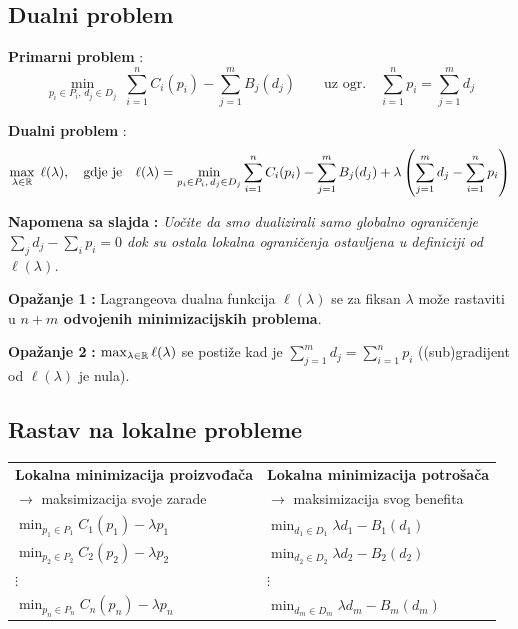 \subsection{Dualni problem}

\textbf{Primarni problem} :
\[
\min_{p_i\in P_i,\,d_j\in D_j}\;
\sum_{i=1}^{n}C_i(p_i) - \sum_{j=1}^{m}B_j(d_j)
\qquad\text{uz ogr.}\quad \sum_{i=1}^{n}p_i = \sum_{j=1}^{m}d_j
\]

\textbf{Dualni problem} :
\[
\max_{\lambda\in\mathbb{R}}\; \ell(\lambda), \quad\text{gdje je}\quad
\ell(\lambda) = \min_{p_i\in P_i,\,d_j\in D_j}
\sum_{i=1}^{n}C_i(p_i) - \sum_{j=1}^{m}B_j(d_j)
+ \lambda\left(\sum_{j=1}^{m}d_j - \sum_{i=1}^{n}p_i\right)
\]

\textbf{Napomena sa slajda} \textbf{:} \emph{Uočite da smo dualizirali
samo globalno ograničenje $\sum_j d_j - \sum_i p_i = 0$ dok su ostala lokalna
ograničenja ostavljena u definiciji od $\ell(\lambda)$.}

\textbf{Opažanje 1} \textbf{:} Lagrangeova dualna funkcija
$\ell(\lambda)$ se za fiksan $\lambda$ može rastaviti u \textbf{$n + m$
odvojenih minimizacijskih problema}.

\textbf{Opažanje 2} \textbf{:} $\max_{\lambda\in\mathbb{R}}\ell(\lambda)$ se
postiže kad je $\sum_{j=1}^{m}d_j = \sum_{i=1}^{n}p_i$ ((sub)gradijent od
$\ell(\lambda)$ je nula).

\subsection{Rastav na lokalne probleme}

\begin{center}
\begin{tabular}{P{6.4cm}P{6.4cm}}
\toprule
\textbf{Lokalna minimizacija proizvođača} &
\textbf{Lokalna minimizacija potrošača} \\
$\to$ maksimizacija svoje zarade &
$\to$ maksimizacija svog benefita \\
\midrule
$\displaystyle\min_{p_1\in P_1} C_1(p_1) - \lambda p_1$ &
$\displaystyle\min_{d_1\in D_1} \lambda d_1 - B_1(d_1)$ \\[6pt]
$\displaystyle\min_{p_2\in P_2} C_2(p_2) - \lambda p_2$ &
$\displaystyle\min_{d_2\in D_2} \lambda d_2 - B_2(d_2)$ \\[2pt]
\quad$\vdots$ & \quad$\vdots$ \\[2pt]
$\displaystyle\min_{p_n\in P_n} C_n(p_n) - \lambda p_n$ &
$\displaystyle\min_{d_m\in D_m} \lambda d_m - B_m(d_m)$ \\
\bottomrule
\end{tabular}
\end{center}

